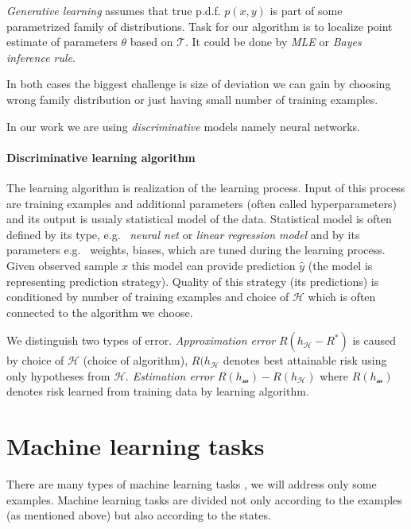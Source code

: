 \emph{Generative learning} assumes that true p.d.f. $p(x,y)$ is part of some parametrized family of distributions. Task for our algorithm is to localize point estimate of parameters $\theta$ based on $\mathcal{T}$. It could be done by \emph{MLE} or \emph{Bayes inference rule}.

In both cases the biggest challenge is size of deviation we can gain by choosing wrong family distribution or just having small number of training examples.

In our work we are using \emph{discriminative} models namely neural networks.

\paragraph{Discriminative learning algorithm}
The learning algorithm is realization of the learning process. Input of this process are training examples and additional parameters (often called hyperparameters) and its output is usualy statistical model of the data. Statistical model is often defined by its type, e.g. \ \emph{neural net} or \emph{linear regression model} and by its parameters e.g. \ weights, biases, which are tuned during the learning process. Given observed sample $x$ this model can provide prediction  $\hat{y}$ (the model is representing prediction strategy). Quality of this strategy (its predictions) is conditioned by number of training examples and choice of $\mathcal{H}$ which is often connected to the algorithm we choose. 

We distinguish two types of error. \emph{Approximation error} $R(h_{\mathcal{H}}-R^*)$  is caused by choice of $\mathcal{H}$ (choice of algorithm), $R(h_{\mathcal{H}}$ denotes best attainable risk using only hypotheses from $\mathcal{H}$. \emph{Estimation error} $R(h_{\mathcal{m}})-R(h_{\mathcal{H}})$ where $R(h_{\mathcal{m}})$ denotes risk learned from training data by learning algorithm.



\section{Machine learning tasks}
There are many types of machine learning tasks \citet{GoodBengCour16}, we will address only some examples. Machine learning tasks are divided not only according to the examples (as mentioned above) but also according to the states.

